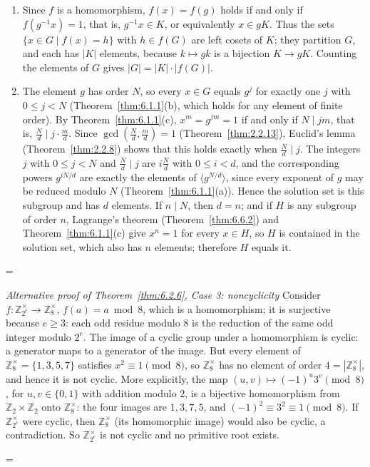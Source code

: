 \documentclass[11pt]{article}
\makeatletter
\theoremstyle{ntstyle}
\let\nt@closedisplay\]
\def\nt@guardedclose{\@ifnextchar\par{\nt@closeafterpar}{\@ifnextchar\end{\postdisplaypenalty\@M\nt@closedisplay}{\nt@closedisplay}}}
\def\nt@closeafterpar\par{\@ifnextchar\par{\nt@closeafterpar}{\@ifnextchar\end{\postdisplaypenalty\@M\nt@closedisplay\par}{\nt@closedisplay\par}}}
\renewenvironment{proof}[1][\proofname]{\par
  \pushQED{\qed}\normalfont\topsep\medskipamount\edef\nt@afterproof{\@endparpenalty=\the\@endparpenalty\relax}\@beginparpenalty\@M\@endparpenalty\@M\let\]\nt@guardedclose\trivlist\item[]\textit{#1\@addpunct{.}} \ignorespaces}{\ifvmode\addpenalty\@M\fi\popQED\nt@afterproof\endtrivlist\@endpefalse}
\newenvironment{altproof}[1][\proofname]{\begin{proof}[#1]\renewcommand{\qedsymbol}{}}{\end{proof}}
\newcommand{\ZmodUnits}[1]{\mathbb{Z}_{#1}^{\times}}
\makeatother
\begin{document}
\begin{proof}

	\begin{enumerate}[label={\alph*)}]
		\item Since $f$ is a homomorphism, $f(x)=f(g)$ holds if and only if
		      $f(g^{-1}x)=1$, that is, $g^{-1}x\in K$, or equivalently $x\in gK$.
		      Thus the sets $\{x\in G\mid f(x)=h\}$ with $h\in f(G)$ are left
		      cosets of $K$; they partition $G$, and each has $|K|$ elements,
		      because $k\mapsto gk$ is a bijection $K\to gK$. Counting the elements
		      of $G$ gives $|G|=|K|\cdot|f(G)|$.
		\item The element $g$ has order $N$, so every $x\in G$ equals $g^j$ for
		      exactly one $j$ with $0\le j<N$ (Theorem~\ref{thm:6.1.1}(b), which holds
		      for any element of finite order). By Theorem~\ref{thm:6.1.1}(c),
		      $x^m=g^{jm}=1$ if and only if $N\mid jm$, that is,
		      $\frac{N}{d}\mid j\cdot\frac{m}{d}$. Since $\gcd(\frac{N}{d},\frac{m}{d})=1$
		      (Theorem~\ref{thm:2.2.13}), Euclid's lemma (Theorem~\ref{thm:2.2.8})
		      shows that this holds exactly when $\frac{N}{d}\mid j$. The integers $j$
		      with $0\le j<N$ and $\frac{N}{d}\mid j$ are $i\frac{N}{d}$ with
		      $0\le i<d$, and the corresponding powers $g^{iN/d}$ are exactly the
		      elements of $\langle g^{N/d}\rangle$, since every exponent of $g$ may be
		      reduced modulo $N$ (Theorem~\ref{thm:6.1.1}(a)). Hence the solution set
		      is this subgroup and has $d$ elements. If $n\mid N$, then $d=n$; and if
		      $H$ is any subgroup of order $n$, Lagrange's theorem
		      (Theorem~\ref{thm:6.6.2}) and Theorem~\ref{thm:6.1.1}(c) give $x^n=1$ for
		      every $x\in H$, so $H$ is contained in the solution set, which also has
		      $n$ elements; therefore $H$ equals it.
	\end{enumerate}

\end{proof}
\begin{altproof}[Alternative proof of Theorem~\ref{thm:6.2.6}, Case 3: noncyclicity] Consider $f : \ZmodUnits{2^e} \to
		\ZmodUnits{8}$, $f(a) = a \bmod 8$, which is a
	homomorphism; it is surjective because $e\ge3$: each odd residue
	modulo $8$ is the reduction of the same odd integer modulo $2^e$. The image of a cyclic group under a homomorphism is
	cyclic: a generator maps to a generator of the image. But every element of $\ZmodUnits{8} = \{1, 3, 5, 7\}$
	satisfies $x^{2} \equiv 1 \pmod{8}$, so $\ZmodUnits{8}$ has no
	element of order $4=|\ZmodUnits{8}|$, and hence it is not cyclic.
	More explicitly, the map $(u,v)\mapsto(-1)^u3^v\pmod8$, for
	$u,v\in\{0,1\}$ with addition modulo $2$, is a bijective homomorphism
	from $\mathbb{Z}_2\times\mathbb{Z}_2$ onto $\ZmodUnits{8}$:
	the four images are $1,3,7,5$, and $(-1)^2\equiv3^2\equiv1\pmod8$.
	If $\ZmodUnits{2^e}$ were cyclic, then
	$\ZmodUnits{8}$ (its homomorphic image) would also be cyclic,
	a contradiction. So $\ZmodUnits{2^e}$ is not cyclic and no
	primitive root exists.

\end{altproof}
\end{document}
